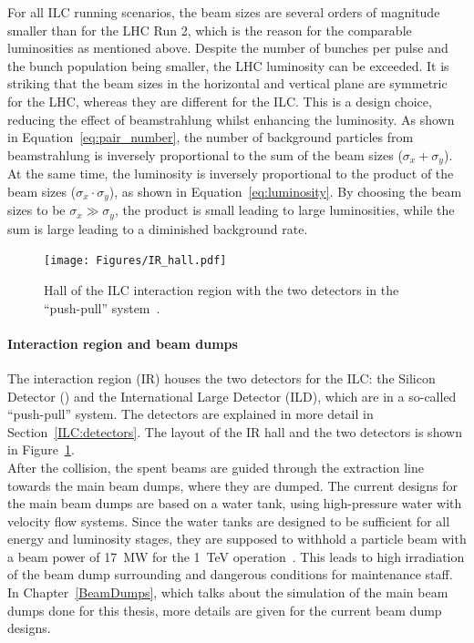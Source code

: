 For all ILC running scenarios, the beam sizes are several orders of magnitude smaller than for the LHC Run 2, which is the reason for the comparable luminosities as mentioned above.
Despite the number of bunches per pulse and the bunch population being smaller, the LHC luminosity can be exceeded.
It is striking that the beam sizes in the horizontal and vertical plane are symmetric for the LHC, whereas they are different for the ILC.
This is a design choice, reducing the effect of beamstrahlung whilst enhancing the luminosity.
As shown in Equation~\ref{eq:pair_number}, the number of background particles from beamstrahlung is inversely proportional to the sum of the beam sizes ($\sigma_x+\sigma_y$).
At the same time, the luminosity is inversely proportional to the product of the beam sizes ($\sigma_x\cdot\sigma_y$), as shown in Equation~\ref{eq:luminosity}.
By choosing the beam sizes to be $\sigma_x\gg\sigma_y$, the product is small leading to large luminosities, while the sum is large leading to a diminished background rate.

\begin{figure}[!h]
\centering
\texttt{[image: Figures/IR\_hall.pdf]}
\caption[Illustration of the ILC interaction region hall]{Hall of the ILC interaction region with the two detectors in the ``push-pull'' system~\cite[p. 29]{TDR1}.}
\label{fig:ILC_IRhall}
\end{figure}
\paragraph{Interaction region and beam dumps}
The interaction region (IR) houses the two detectors for the ILC: the Silicon Detector (\sid) and the International Large Detector (ILD), which are in a so-called ``push-pull'' system.
The detectors are explained in more detail in Section~\ref{ILC:detectors}.
The layout of the IR hall and the two detectors is shown in Figure~\ref{fig:ILC_IRhall}.
\\After the collision, the spent beams are guided through the extraction line towards the main beam dumps, where they are dumped.
The current designs for the main beam dumps are based on a water tank, using high-pressure water with velocity flow systems.
Since the water tanks are designed to be sufficient for all energy and luminosity stages, they are supposed to withhold a particle beam with a beam power of \SI{17}{\mega\watt} for the \SI{1}{\TeV} operation~\cite[p. 18]{TDR32}.
This leads to high irradiation of the beam dump surrounding and dangerous conditions for maintenance staff.
In Chapter~\ref{BeamDumps}, which talks about the simulation of the main beam dumps done for this thesis, more details are given for the current beam dump designs.


